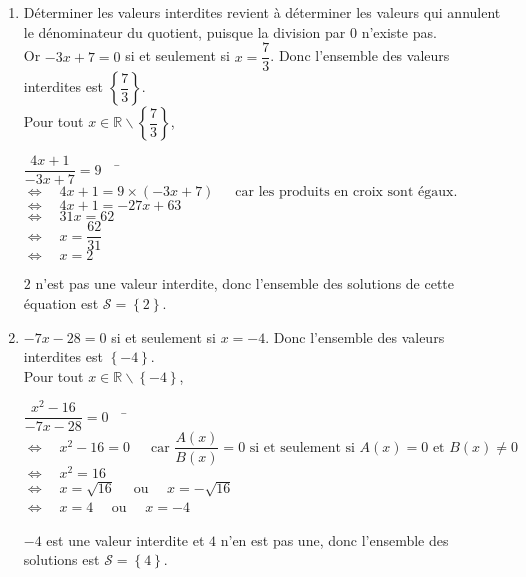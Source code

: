 \documentclass[a4paper,11pt,exos]{nsi} %
\begin{document}
\begin{enumerate}
    \item Déterminer les valeurs interdites revient à déterminer les valeurs qui annulent le dénominateur du quotient, puisque la division par $0$ n'existe pas.\\Or $-3x+7=0$ si et seulement si  $x=\dfrac{7}{3}$. 
    Donc l'ensemble des valeurs interdites est  $\left\{\dfrac{7}{3}\right\}$. \\
    Pour tout $x\in \mathbb{R}\smallsetminus\left\{\dfrac{7}{3}\right\}$,
    \begin{tabbing}
        $\dfrac{4x+1}{-3x+7}=9 \quad$ \= $\iff \quad 4x+1=9\times(-3x+7)\,\,\,\,\,\,\,\text{ car les produits en croix sont égaux.}$\\
        \>  $\iff \quad 4x+1= -27x+63$\\
        \>  $\iff \quad 31x= 62$\\
        \>  $\iff \quad x=\dfrac{62}{31}$\\
        \>  $\iff \quad x=2$
    \end{tabbing}
    $2$ n'est pas une valeur interdite, donc l'ensemble des solutions de cette équation est  $\mathcal{S}=\left\{2\right\}$.

    \item $-7x-28=0$ si et seulement si  $x=-4$. 
    Donc l'ensemble des valeurs interdites est  $\left\{-4\right\}$.\\
    Pour tout $x\in \mathbb{R}\smallsetminus\left\{-4\right\}$, 
    \begin{tabbing}
        $\dfrac{x^2-16}{-7x-28}=0 \quad$    \=  $\iff \quad x^2-16=0\,\,\,\,\,\,\, \text{ car }\dfrac{A(x)}{B(x)}=0 \text { si et seulement si } A(x)=0 \text { et } B(x)\neq 0$\\
        \>  $\iff \quad x^2=16$\\
        \>  $\iff \quad x=\sqrt{16}\quad$ ou $\quad x=-\sqrt{16}$\\
        \>  $\iff \quad x=4 \quad$ ou $\quad x=-4$
    \end{tabbing}
    $-4$ est une valeur interdite et $4$ n'en est pas une, donc l'ensemble des solutions est  $\mathcal{S}=\left\{4\right\}$.


    

\end{enumerate}
\end{document}
